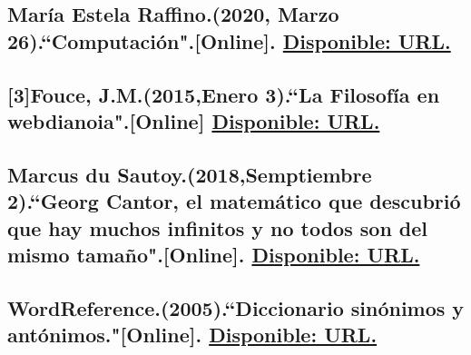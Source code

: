 \documentclass{report}   %
\begin{document}
    \subsection{María Estela Raffino.(2020, Marzo 26).``Computación".[Online].
    \href{https://concepto.de/computacion/}{Disponible: URL.}}
    \subsection{[3]Fouce, J.M.(2015,Enero 3).``La Filosofía en webdianoia".[Online]
    \href{http://www.webdianoia.com/index.html}{Disponible: URL.}}
    \subsection{Marcus du Sautoy.(2018,Semptiembre 2).``Georg Cantor, el matemático que descubrió que hay muchos infinitos y no todos son del mismo tamaño".[Online].
    \href{https://www.bbc.com/mundo/noticias-45300219}{Disponible: URL.}}
    \subsection{WordReference.(2005).``Diccionario sinónimos y antónimos."[Online].
    \href{https://www.wordreference.com/}{Disponible: URL.}}
\end{document}
